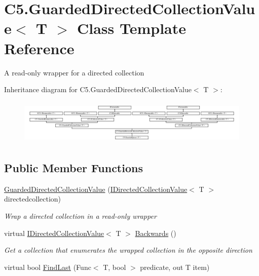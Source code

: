 \hypertarget{class_c5_1_1_guarded_directed_collection_value}{}\section{C5.\+Guarded\+Directed\+Collection\+Value$<$ T $>$ Class Template Reference}
\label{class_c5_1_1_guarded_directed_collection_value}


A read-\/only wrapper for a directed collection  


Inheritance diagram for C5.\+Guarded\+Directed\+Collection\+Value$<$ T $>$\+:\begin{figure}[H]
\begin{center}
\leavevmode
\includegraphics[height=2.178988cm]{class_c5_1_1_guarded_directed_collection_value}
\end{center}
\end{figure}
\subsection*{Public Member Functions}
\begin{DoxyCompactItemize}
\item 
\hyperlink{class_c5_1_1_guarded_directed_collection_value_ad940eb94010d945eae313b9375dd2df6}{Guarded\+Directed\+Collection\+Value} (\hyperlink{interface_c5_1_1_i_directed_collection_value}{I\+Directed\+Collection\+Value}$<$ T $>$ directedcollection)
\begin{DoxyCompactList}\small\item\em Wrap a directed collection in a read-\/only wrapper \end{DoxyCompactList}\item 
virtual \hyperlink{interface_c5_1_1_i_directed_collection_value}{I\+Directed\+Collection\+Value}$<$ T $>$ \hyperlink{class_c5_1_1_guarded_directed_collection_value_a14e2ad2eb0afbaf5e1ad2e970db81a5b}{Backwards} ()
\begin{DoxyCompactList}\small\item\em Get a collection that enumerates the wrapped collection in the opposite direction \end{DoxyCompactList}\item 
virtual bool \hyperlink{class_c5_1_1_guarded_directed_collection_value_a755cdf8f197ed79d7616a2b2527d718d}{Find\+Last} (Func$<$ T, bool $>$ predicate, out T item)
\end{DoxyCompactItemize}
